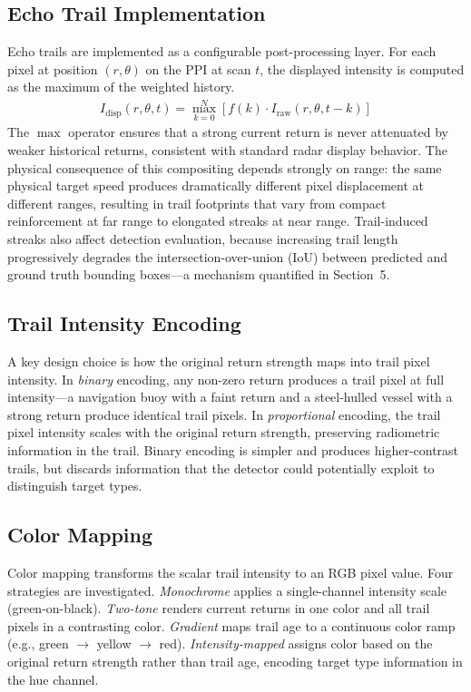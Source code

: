 \documentclass[colorlinks,upint,balance]{asmeconf}
\begin{document}
\subsection{Echo Trail Implementation}

Echo trails are implemented as a configurable post-processing layer. For each pixel at position $(r, \theta)$ on the PPI at scan $t$, the displayed intensity is computed as the maximum of the weighted history.
\begin{align}
	I_{\mathrm{disp}}(r, \theta, t) = \max_{k=0}^{N} \left[ f(k) \cdot I_{\mathrm{raw}}(r, \theta, t-k) \right]
	\label{eq:trail_composite}
\end{align}
The $\max$ operator ensures that a strong current return is never attenuated by weaker historical returns, consistent with standard radar display behavior. The physical consequence of this compositing depends strongly on range: the same physical target speed produces dramatically different pixel displacement at different ranges, resulting in trail footprints that vary from compact reinforcement at far range to elongated streaks at near range. Trail-induced streaks also affect detection evaluation, because increasing trail length progressively degrades the intersection-over-union (IoU) between predicted and ground truth bounding boxes---a mechanism quantified in Section~5.

\subsection{Trail Intensity Encoding}

A key design choice is how the original return strength maps into trail pixel intensity. In \textit{binary} encoding, any non-zero return produces a trail pixel at full intensity---a navigation buoy with a faint return and a steel-hulled vessel with a strong return produce identical trail pixels. In \textit{proportional} encoding, the trail pixel intensity scales with the original return strength, preserving radiometric information in the trail. Binary encoding is simpler and produces higher-contrast trails, but discards information that the detector could potentially exploit to distinguish target types.

\subsection{Color Mapping}

Color mapping transforms the scalar trail intensity to an RGB pixel value. Four strategies are investigated. \textit{Monochrome} applies a single-channel intensity scale (green-on-black). \textit{Two-tone} renders current returns in one color and all trail pixels in a contrasting color. \textit{Gradient} maps trail age to a continuous color ramp (e.g., green $\rightarrow$ yellow $\rightarrow$ red). \textit{Intensity-mapped} assigns color based on the original return strength rather than trail age, encoding target type information in the hue channel.
\end{document}
